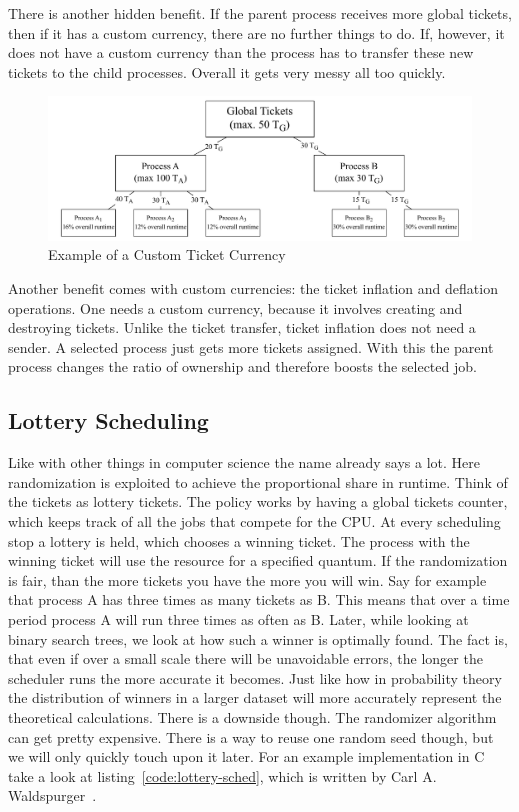 There is another hidden benefit. If the parent process receives more global tickets, then if it has a custom currency, there are no further things to do.
If, however, it does not have a custom currency than the process has to transfer these new tickets to the child processes. Overall it gets very messy all too quickly.

\begin{figure}[h]
    \centering
    \includegraphics[width=\textwidth]{Assets/Ticket-Currency.pdf}
    \caption{Example of a Custom Ticket Currency}
    \label{fig:ticket-currencies}
\end{figure}
 
Another benefit comes with custom currencies: the ticket inflation and deflation operations.
One needs a custom currency, because it involves creating and destroying tickets.
Unlike the ticket transfer, ticket inflation does not need a sender.
A selected process just gets more tickets assigned.
With this the parent process changes the ratio of ownership and therefore boosts the selected job.


\subsection{Lottery Scheduling}

Like with other things in computer science the name already says a lot.
Here randomization is exploited to achieve the proportional share in runtime.
Think of the tickets as lottery tickets.
The policy works by having a global tickets counter, which keeps track of all the jobs that compete for the CPU.
At every scheduling stop a lottery is held, which chooses a winning ticket. The process with the winning ticket will use the resource for a specified quantum.
If the randomization is fair, than the more tickets you have the more you will win.
Say for example that process A has three times as many tickets as B. This means that over a time period process A will run three times as often as B.
Later, while looking at binary search trees, we look at how such a winner is optimally found.
The fact is, that even if over a small scale there will be unavoidable errors, the longer the scheduler runs the more accurate it becomes.
Just like how in probability theory the distribution of winners in a larger dataset will more accurately represent the theoretical calculations.
There is a downside though.
The randomizer algorithm can get pretty expensive.
There is a way to reuse one random seed though, but we will only quickly touch upon it later.
For an example implementation in C take a look at listing~\ref{code:lottery-sched}, which is written by Carl A. Waldspurger~\cite{waldspurger95}.

